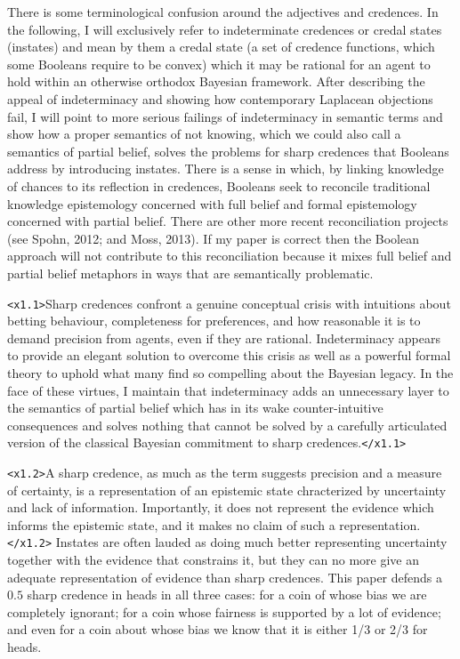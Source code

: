 \documentclass[11pt]{article}
\begin{document}
There is some terminological confusion around the adjectives   and  credences. In the following, I will exclusively refer to indeterminate credences or credal states (instates) and mean by them a credal state (a set of credence functions, which some Booleans require to be convex) which it may be rational for an agent to hold within an otherwise orthodox Bayesian framework. After describing the appeal of indeterminacy and showing how contemporary Laplacean objections fail, I will point to more serious failings of indeterminacy in semantic terms and show how a proper semantics of not knowing, which we could also call a semantics of partial belief, solves the problems for sharp credences that Booleans address by introducing instates. There is a sense in which, by linking knowledge of chances to its reflection in credences, Booleans seek to reconcile traditional knowledge epistemology concerned with full belief and formal epistemology concerned with partial belief. There are other more recent reconciliation projects (see Spohn, 2012; and Moss, 2013). If my paper is correct then the Boolean approach will not contribute to this reconciliation because it mixes full belief and partial belief metaphors in ways that are semantically problematic.

\texttt{<x1.1>}Sharp credences confront a genuine conceptual crisis with intuitions about betting behaviour, completeness for preferences, and how reasonable it is to demand precision from agents, even if they are rational. Indeterminacy appears to provide an elegant solution to overcome this crisis as well as a powerful formal theory to uphold what many find so compelling about the Bayesian legacy. In the face of these virtues, I maintain that indeterminacy adds an unnecessary layer to the semantics of partial belief which has in its wake counter-intuitive consequences and solves nothing that cannot be solved by a carefully articulated version of the classical Bayesian commitment to sharp credences.\texttt{</x1.1>}

\texttt{<x1.2>}A sharp credence, as much as the term suggests precision and a measure of certainty, is a representation of an epistemic state chracterized by uncertainty and lack of information. Importantly, it does not represent the evidence which informs the epistemic state, and it makes no claim of such a representation.\texttt{</x1.2>} Instates are often lauded as doing much better representing uncertainty together with the evidence that constrains it, but they can no more give an adequate representation of evidence than sharp credences. This paper defends a $0.5$ sharp credence in heads in all three cases: for a coin of whose bias we are completely ignorant; for a coin whose fairness is supported by a lot of evidence; and even for a coin about whose bias we know that it is either 1/3 or 2/3 for heads.
\end{document}
